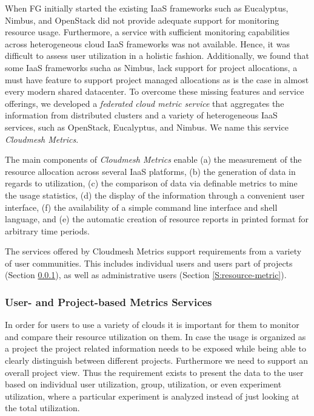 \documentclass{tex/sig-alternate-2013}
\newcommand{\todo}[1]{{\color{red}{#1}}}
\begin{document}
{When FG initially started the existing IaaS frameworks such as
Eucalyptus, Nimbus, and OpenStack did not provide adequate support for
monitoring resource usage. Furthermore, a service with sufficient
monitoring capabilities across heterogeneous cloud IaaS frameworks was
not available. Hence, it was difficult to assess user utilization in a
holistic fashion. Additionally, we found that some IaaS frameworks
sucha as Nimbus, lack support for project allocations, a must have
feature to support project managed allocations as is the case in
almost every modern shared datacenter.  To overcome these missing
features and service offerings, we developed a {\em federated cloud metric
service} that aggregates the information from distributed clusters and a
variety of heterogeneous IaaS services, such as OpenStack, Eucalyptus,
and Nimbus. We name this service {\em Cloudmesh Metrics}.

The main components of {\em Cloudmesh Metrics} enable (a) the
measurement of the resource allocation across several IaaS platforms,
(b) the generation of data in regards to utilization, (c) the
comparison of data via definable metrics to mine the usage statistics,
(d) the display of the information through a convenient user
interface, (f) the availability of a simple command line interface and
shell language, and (e) the automatic creation of resource reports in
printed format for arbitrary time periods.

The services offered by Cloudmesh Metrics support requirements from a
variety of user communities. This includes individual users and users
part of projects (Section \ref{S:user-metric}), as well as administrative users
(Section \ref{S:resource-metric}).


\subsubsection{User- and Project-based Metrics Services}\label{S:user-metric} 

\todo{READ}

In order for users to use a variety of clouds it is important for them
to monitor and compare their resource utilization on them. In case the
usage is organized as a project the project related information needs
to be exposed while being able to clearly distinguish between
different projects. Furthermore we need to support an overall project
view.  Thus the requirement exists to present the data to the user
based on individual user utilization, group, utilization, or even
experiment utilization, where a particular experiment is analyzed
instead of just looking at the total utilization.

}
\end{document}
